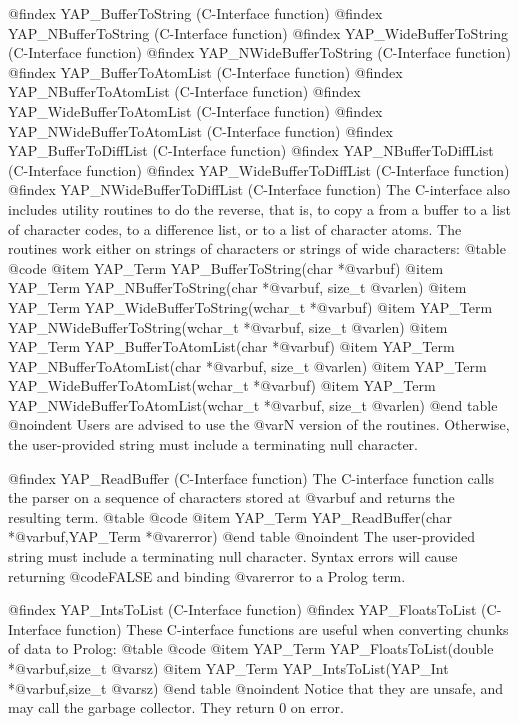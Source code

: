 @findex YAP_BufferToString (C-Interface function)
@findex YAP_NBufferToString (C-Interface function)
@findex YAP_WideBufferToString (C-Interface function)
@findex YAP_NWideBufferToString (C-Interface function)
@findex YAP_BufferToAtomList (C-Interface function)
@findex YAP_NBufferToAtomList (C-Interface function)
@findex YAP_WideBufferToAtomList (C-Interface function)
@findex YAP_NWideBufferToAtomList (C-Interface function)
@findex YAP_BufferToDiffList (C-Interface function)
@findex YAP_NBufferToDiffList (C-Interface function)
@findex YAP_WideBufferToDiffList (C-Interface function)
@findex YAP_NWideBufferToDiffList (C-Interface function)
The C-interface also includes utility routines to do the reverse, that
is, to copy a from a buffer to a list of character codes, to a
difference list,  or to a list of
character atoms. The routines work either on strings of characters or
strings of wide characters:
@table @code
@item      YAP_Term YAP_BufferToString(char *@var{buf})
 @item     YAP_Term YAP_NBufferToString(char *@var{buf}, size_t @var{len})
@item      YAP_Term YAP_WideBufferToString(wchar_t *@var{buf})
@item      YAP_Term YAP_NWideBufferToString(wchar_t *@var{buf}, size_t @var{len})
@item      YAP_Term YAP_BufferToAtomList(char *@var{buf})
@item      YAP_Term YAP_NBufferToAtomList(char *@var{buf}, size_t @var{len})
@item      YAP_Term YAP_WideBufferToAtomList(wchar_t *@var{buf})
@item      YAP_Term YAP_NWideBufferToAtomList(wchar_t *@var{buf}, size_t @var{len})
@end table
@noindent
Users are advised to use the @var{N} version of the routines. Otherwise,
the user-provided string must include a terminating null character.

@findex YAP_ReadBuffer (C-Interface function)
The C-interface function calls the parser on a sequence of characters
stored at @var{buf} and returns the resulting term.
@table @code
 @item     YAP_Term YAP_ReadBuffer(char *@var{buf},YAP_Term *@var{error})
@end table
@noindent
The user-provided string must include a terminating null
character. Syntax errors will cause returning @code{FALSE} and binding
@var{error} to a Prolog term.

@findex YAP_IntsToList (C-Interface function)
@findex YAP_FloatsToList (C-Interface function)
These C-interface functions are useful when converting chunks of data to Prolog:
@table @code
@item      YAP_Term YAP_FloatsToList(double *@var{buf},size_t @var{sz})
@item      YAP_Term YAP_IntsToList(YAP_Int *@var{buf},size_t @var{sz})
@end table
@noindent
Notice that they are unsafe, and may call the garbage collector. They
return 0 on error.

